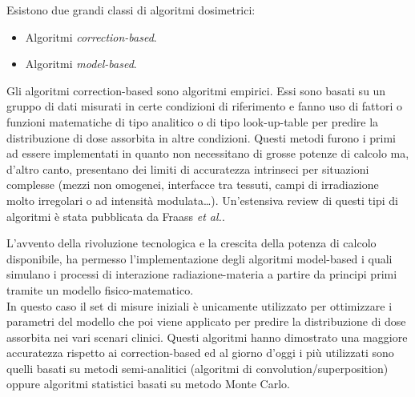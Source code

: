 Esistono due grandi classi di algoritmi dosimetrici:
\begin{itemize}
\item Algoritmi \textit{correction-based}.
\item Algoritmi \textit{model-based}.
\end{itemize}
Gli algoritmi correction-based sono algoritmi empirici. Essi sono  basati su un gruppo di dati misurati in certe condizioni di riferimento e fanno uso di fattori o funzioni matematiche di tipo analitico o di tipo look-up-table per predire la distribuzione di dose assorbita in altre condizioni. 
Questi metodi furono i primi ad essere implementati in quanto non necessitano di grosse potenze di calcolo ma, d'altro canto, presentano dei limiti di accuratezza intrinseci per situazioni complesse (mezzi non omogenei, interfacce tra tessuti, campi di irradiazione molto irregolari o ad intensità modulata\ldots). Un'estensiva review di questi tipi di algoritmi è stata pubblicata da Fraass \textit{et al.}\cite{Fraass1995}.

\vspace{.2cm}
L'avvento della rivoluzione tecnologica e la crescita della potenza di calcolo disponibile, ha permesso l'implementazione degli algoritmi model-based i quali simulano i processi di interazione radiazione-materia  a partire da principi primi tramite un modello fisico-matematico.\\
In questo caso il set di misure iniziali è unicamente utilizzato per ottimizzare i parametri del modello che poi viene applicato per predire la distribuzione di dose assorbita nei vari scenari clinici. Questi algoritmi hanno dimostrato una maggiore accuratezza rispetto ai correction-based ed al giorno d'oggi i più utilizzati sono quelli basati su metodi semi-analitici (algoritmi di convolution/superposition) oppure algoritmi statistici basati su metodo Monte Carlo.

